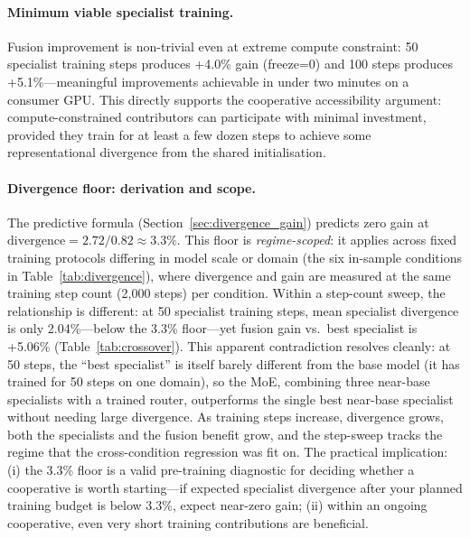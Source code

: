 \documentclass{article}
\begin{document}
\paragraph{Minimum viable specialist training.} Fusion improvement is non-trivial even at extreme compute constraint: 50 specialist training steps produces +4.0\% gain (freeze=0) and 100 steps produces +5.1\%---meaningful improvements achievable in under two minutes on a consumer GPU. This directly supports the cooperative accessibility argument: compute-constrained contributors can participate with minimal investment, provided they train for at least a few dozen steps to achieve some representational divergence from the shared initialisation.

\paragraph{Divergence floor: derivation and scope.}
The predictive formula (Section~\ref{sec:divergence_gain}) predicts zero gain at $\text{divergence} = 2.72 / 0.82 \approx 3.3\%$. This floor is \emph{regime-scoped}: it applies across fixed training protocols differing in model scale or domain (the six in-sample conditions in Table~\ref{tab:divergence}), where divergence and gain are measured at the same training step count (2,000 steps) per condition. Within a step-count sweep, the relationship is different: at 50 specialist training steps, mean specialist divergence is only 2.04\%---below the 3.3\% floor---yet fusion gain vs.\ best specialist is +5.06\% (Table~\ref{tab:crossover}). This apparent contradiction resolves cleanly: at 50 steps, the ``best specialist'' is itself barely different from the base model (it has trained for 50 steps on one domain), so the MoE, combining three near-base specialists with a trained router, outperforms the single best near-base specialist without needing large divergence. As training steps increase, divergence grows, both the specialists and the fusion benefit grow, and the step-sweep tracks the regime that the cross-condition regression was fit on. The practical implication: (i) the 3.3\% floor is a valid pre-training diagnostic for deciding whether a cooperative is worth starting---if expected specialist divergence after your planned training budget is below 3.3\%, expect near-zero gain; (ii) within an ongoing cooperative, even very short training contributions are beneficial.
\end{document}
